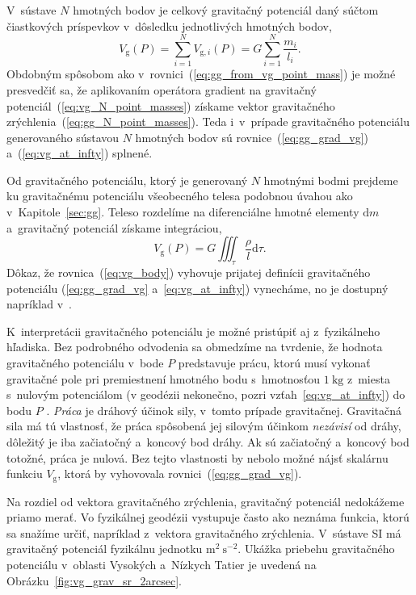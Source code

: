 \documentclass[a4paper, 12pt]{book}
\newcommand{\diff}{\mathrm d}
\newcommand{\gidx}{\mathrm g}
\begin{document}
V~sústave $N$ hmotných bodov je celkový gravitačný potenciál daný súčtom
čiastkových príspevkov v~dôsledku jednotlivých hmotných bodov,
%
\begin{equation}
\label{eq:vg_N_point_masses}
V_\gidx(P) = \sum_{i = 1}^{N} V_{\gidx,i}(P) = G \sum_{i = 1}^{N}\frac{
m_i}{l_i}{.}
\end{equation}
%
Obdobným spôsobom ako v~rovnici~(\ref{eq:gg_from_vg_point_mass}) je možné
presvedčiť sa, že aplikovaním operátora gradient na gravitačný
potenciál~(\ref{eq:vg_N_point_masses}) získame vektor gravitačného
zrýchlenia~(\ref{eq:gg_N_point_masses}).  Teda i~v~prípade gravitačného
potenciálu generovaného sústavou $N$ hmotných bodov sú
rovnice~(\ref{eq:gg_grad_vg}) a~(\ref{eq:vg_at_infty}) splnené.

Od gravitačného potenciálu, ktorý je generovaný $N$ hmotnými bodmi prejdeme ku
gravitačnému potenciálu všeobecného telesa podobnou úvahou ako
v~Kapitole~\ref{sec:gg}.  Teleso rozdelíme na diferenciálne hmotné elementy
$\diff m$ a~gravitačný potenciál získame integráciou,
%
\begin{equation}
\label{eq:vg_body}
V_\gidx(P) = G \iiint_{\tau} \frac{\rho}{l} \diff\tau{.}
\end{equation}
%
Dôkaz, že rovnica~(\ref{eq:vg_body}) vyhovuje prijatej definícii gravitačného
potenciálu (\ref{eq:gg_grad_vg} a~\ref{eq:vg_at_infty}) vynecháme, no je
dostupný napríklad v~\cite{MacMillan1930}.

K~interpretácii gravitačného potenciálu je možné pristúpiť aj z~fyzikálneho
hľadiska.  Bez podrobného odvodenia sa obmedzíme na tvrdenie, že hodnota
gravitačného potenciálu v~bode $P$ predstavuje prácu, ktorú musí vykonať
gravitačné pole pri premiestnení hmotného bodu s~hmotnosťou $1\ \mathrm{kg}$
z~miesta s~nulovým potenciálom (v geodézii nekonečno, pozri
vzťah~\ref{eq:vg_at_infty}) do bodu $P$
\citep{MacMillan1930,Kellogg1967,TorgeGeodesy}.  \emph{Práca} je dráhový účinok
sily, v~tomto prípade gravitačnej.  Gravitačná sila má tú vlastnosť, že práca
spôsobená jej silovým účinkom \emph{nezávisí} od dráhy, dôležitý je iba
začiatočný a~koncový bod dráhy.  Ak sú začiatočný a~koncový bod totožné, práca
je nulová.  Bez tejto vlastnosti by nebolo možné nájsť skalárnu funkciu
$V_\gidx$, ktorá by vyhovovala rovnici~(\ref{eq:gg_grad_vg}).

Na rozdiel od vektora gravitačného zrýchlenia, gravitačný potenciál nedokážeme
priamo merať.  Vo fyzikálnej geodézii vystupuje často ako neznáma funkcia,
ktorú sa snažíme určiť, napríklad z~vektora gravitačného zrýchlenia.  V~sústave
SI má gravitačný potenciál fyzikálnu jednotku $\mathrm{m}^2\ \mathrm{s}^{-2}$.
Ukážka priebehu gravitačného potenciálu v~oblasti Vysokých a~Nízkych Tatier je
uvedená na Obrázku~\ref{fig:vg_grav_sr_2arcsec}.
\end{document}
